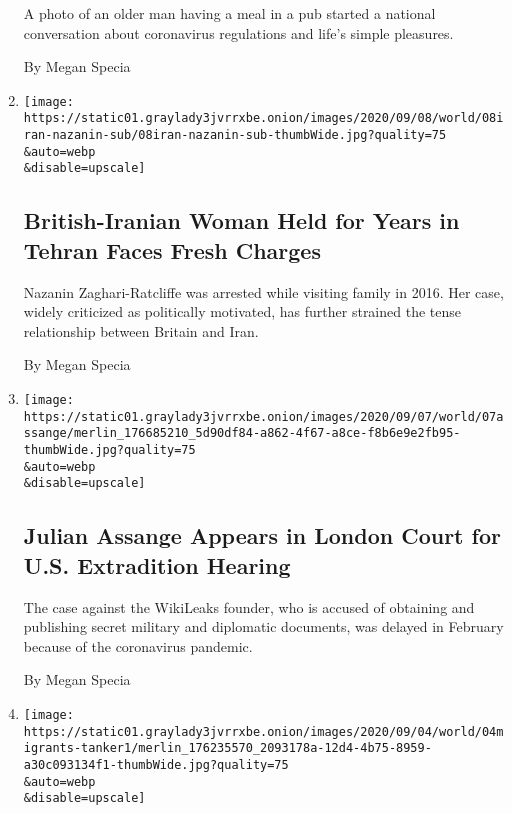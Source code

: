 \begin{enumerate}
  A photo of an older man having a meal in a pub started a national
  conversation about coronavirus regulations and life's simple
  pleasures.

  By Megan Specia
\item
  \href{/2020/09/08/world/middleeast/nazanin-zaghari-ratcliffe-iran-charges.html}{}

  \texttt{[image: https://static01.graylady3jvrrxbe.onion/images/2020/09/08/world/08iran-nazanin-sub/08iran-nazanin-sub-thumbWide.jpg?quality=75\\\&auto=webp\\\&disable=upscale]}

  \hypertarget{british-iranian-woman-held-for-years-in-tehran-faces-fresh-charges}{%
  \subsection{British-Iranian Woman Held for Years in Tehran Faces Fresh
  Charges}\label{british-iranian-woman-held-for-years-in-tehran-faces-fresh-charges}}

  Nazanin Zaghari-Ratcliffe was arrested while visiting family in 2016.
  Her case, widely criticized as politically motivated, has further
  strained the tense relationship between Britain and Iran.

  By Megan Specia
\item
  \href{/2020/09/07/world/europe/assange-court-extradition-london.html}{}

  \texttt{[image: https://static01.graylady3jvrrxbe.onion/images/2020/09/07/world/07assange/merlin\_176685210\_5d90df84-a862-4f67-a8ce-f8b6e9e2fb95-thumbWide.jpg?quality=75\\\&auto=webp\\\&disable=upscale]}

  \hypertarget{julian-assange-appears-in-london-court-for-us-extradition-hearing}{%
  \subsection{Julian Assange Appears in London Court for U.S.
  Extradition
  Hearing}\label{julian-assange-appears-in-london-court-for-us-extradition-hearing}}

  The case against the WikiLeaks founder, who is accused of obtaining
  and publishing secret military and diplomatic documents, was delayed
  in February because of the coronavirus pandemic.

  By Megan Specia
\item
  \href{/2020/09/04/world/europe/migrant-tanker-mediterranean.html}{}

  \texttt{[image: https://static01.graylady3jvrrxbe.onion/images/2020/09/04/world/04migrants-tanker1/merlin\_176235570\_2093178a-12d4-4b75-8959-a30c093134f1-thumbWide.jpg?quality=75\\\&auto=webp\\\&disable=upscale]}


\end{enumerate}
